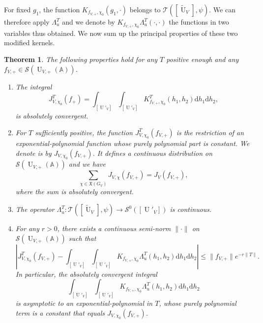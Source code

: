 \documentclass[letterpaper,11pt]{amsart}
\newcommand{\fX}{\mathfrak{X}}
\newcommand{\bA}{\mathbb{A}}
\newcommand{\cS}{\mathcal{S}}
\newcommand{\cT}{\mathcal{T}}
\newcommand{\rd}{\mathrm{d}}
\newcommand{\<}{\negthickspace}
\providecommand{\aabs}[1]{\lVert#1\rVert}
\newcommand{\valP}[1]{\left|#1\right|}
\DeclareMathOperator{\U}{U}
\theoremstyle{definition}
\theoremstyle{plain}
\newtheorem{theorem}[definition]{Theorem}
\theoremstyle{remark}
\numberwithin{equation}{section}
\begin{document}
For fixed $g_1$, the function $K_{f_{V,+},\chi_0}(g_1,\cdot)$ belongs to $\cT([\widetilde{\U}_V],\psi)$. We can therefore apply $\Lambda_u^T$ and we denote by $K_{f_{V,+},\chi_0}\Lambda_u^T(\cdot,\cdot) $ the functions in two variables thus obtained. We now sum up the principal properties of these two modified kernels.

\begin{theorem}
    \label{thm:truncated_prop_u}
    The following properties hold for any $T$ positive enough and any $f_{V,+} \in \cS(\U_{V,+}(\bA))$.
    \begin{enumerate}
        \item \cite[Proposition~7.5]{BLX1} The integral 
        \begin{equation*}
            J_{V,\chi_0}^T(f_+)=\int_{[\U'_V]} \int_{[\U'_V]}K_{f_{V,+},\chi_0}^T(h_1,h_2) \rd h_1 \rd h_2,
        \end{equation*}
        is absolutely convergent. 
        \item \cite[Theorem~7.6]{BLX1} For $T$ sufficiently positive, the function $J^T_{V,\chi_0}(f_{V,+})$ is the
        restriction of an exponential-polynomial function whose purely polynomial part
        is constant. We denote is by $J_{V,\chi_0}(f_{V,+})$. It defines a continuous distribution on $\cS(\U_{V,+}(\bA))$  and we have
            \[
            \sum_{\chi \in \fX(G_{V})} J_{V,\chi}(f_{V,+}) = J_V(f_{V,+}),
            \]
        where the sum is absolutely convergent.
        \item \cite[Section~7.7]{BLX1} The operator $\Lambda_u^T : \cT([\widetilde{\U}_V],\psi) \to \cS^0([\U'_V])$ is continuous. 
        \item \cite[Section~7.8]{BLX1} For any $r>0$, there exists a continuous semi-norm $\aabs{\cdot}$ on $\cS(\U_{V,+}(\bA))$ such that 
        \begin{equation*}
            \valP{J_{V,\chi_0}^T (f_{V,+})-\int_{[\U'_V]} \int_{[\U'_V]} K_{f_{V,+},\chi_0} \Lambda_u^T(h_1,h_2) \rd h_1 \rd h_2 } \leq \aabs{f_{V,+}} e^{-r \aabs{T}}.
        \end{equation*}
        In particular, the absolutely convergent integral
        \begin{equation*}
            \int_{[\U'_V]}\int_{[\U'_V]} K_{f_{V,+},\chi_0} \Lambda_u^T(h_1,h_2) \rd h_1 \rd h_2
        \end{equation*} 
        is asymptotic to an exponential-polynomial in $T$, whose purely polynomial term is a constant that equals $J_{V,\chi_0}(f_{V,+})$.
    \end{enumerate}
\end{theorem}
\end{document}
